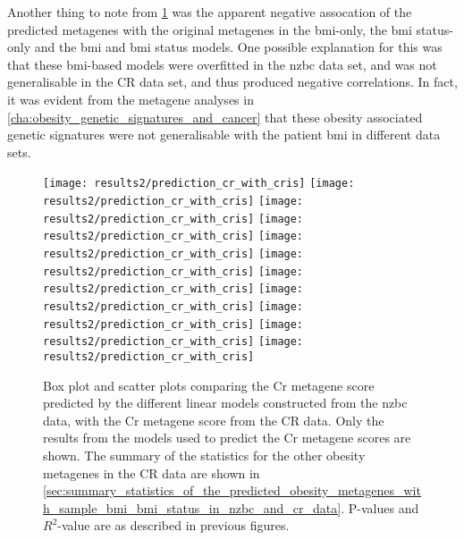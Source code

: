 Another thing to note from \cref{fig:predict_cr_cris} was the apparent negative assocation of the predicted metagenes with the original metagenes in the \gls{bmi}-only, the \gls{bmi} status-only and the \gls{bmi} and \gls{bmi} status models.
One possible explanation for this was that these \gls{bmi}-based models were overfitted in the \gls{nzbc} data set, and was not generalisable in the CR data set, and thus produced negative correlations.
In fact, it was evident from the metagene analyses in \cref{cha:obesity_genetic_signatures_and_cancer} that these obesity associated genetic signatures were not generalisable with the patient \gls{bmi} in different data sets.

\begin{figure}[htpb]
	\centering
	\texttt{[image: results2/prediction\_cr\_with\_cris]}
	\texttt{[image: results2/prediction\_cr\_with\_cris]}
	\texttt{[image: results2/prediction\_cr\_with\_cris]}
	\texttt{[image: results2/prediction\_cr\_with\_cris]}
	\texttt{[image: results2/prediction\_cr\_with\_cris]}
	\texttt{[image: results2/prediction\_cr\_with\_cris]}
	\texttt{[image: results2/prediction\_cr\_with\_cris]}
	\texttt{[image: results2/prediction\_cr\_with\_cris]}
	\texttt{[image: results2/prediction\_cr\_with\_cris]}
	\texttt{[image: results2/prediction\_cr\_with\_cris]}
	\texttt{[image: results2/prediction\_cr\_with\_cris]}
	\caption[Comparison of the predicted Cr metagene scores with the Cr metagene score from the CR data]{ Box plot and scatter plots comparing the Cr metagene score predicted by the different linear models constructed from the \gls{nzbc} data, with the Cr metagene score from the CR data.
	Only the results from the models used to predict the Cr metagene scores are shown.
	The summary of the statistics for the other obesity metagenes in the CR data are shown in \cref{sec:summary_statistics_of_the_predicted_obesity_metagenes_with_sample_bmi_bmi_status_in_nzbc_and_cr_data}.
	P-values and $R^2$-value are as described in previous figures.
	}
	\label{fig:predict_cr_cris}
\end{figure}

